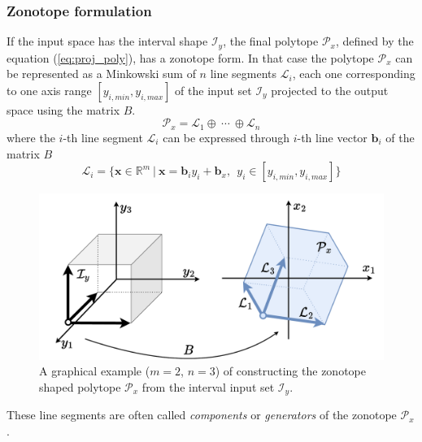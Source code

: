 \subsubsection*{Zonotope formulation} If the input space has the interval shape $\mathcal{I}_y$, the final polytope $\mathcal{P}_x$, defined by the equation (\ref{eq:proj_poly}), has a zonotope form. In that case the polytope $\mathcal{P}_x$ can be represented as a Minkowski sum of $n$ line segments $\mathcal{L}_i$, each one corresponding to one axis range $[y_{i,min}, y_{i,max}]$ of the input set $\mathcal{I}_y$ projected to the output space using the matrix $B$.  \cite{McMullen1971onzonotopes}
\begin{equation}
    \mathcal{P}_x = \mathcal{L}_1 \oplus~ \cdots ~\oplus \mathcal{L}_n
\end{equation}
where the $i$-th line segment $\mathcal{L}_i$ can be expressed through $i$-th line vector $\bm{b}_i$ of the matrix $B$
\begin{equation}
    \mathcal{L}_i = \{\bm{x}\in\mathbb{R}^m ~|~ \bm{x} = \bm{b}_iy_i + \bm{b}_x,~~ y_i\in [y_{i,min}, y_{i,max}] \}
\end{equation}
\begin{figure}
\vspace{-0.5cm}
    \centering
    \includegraphics[width=\linewidth]{Chapters/imgs/zonotope_only.pdf}
    \caption{A graphical example ($m=2$, $n=3$) of constructing the zonotope shaped polytope $\mathcal{P}_x$ from the interval input set $\mathcal{I}_y$.}
    \label{fig:image_projection_two}
\end{figure}
These line segments are often called \textit{components} or \textit{generators} of the zonotope $\mathcal{P}_x$ \cite{shephard1974zonotopes}.


